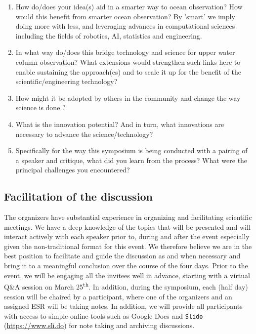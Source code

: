 \begin{enumerate}[noitemsep,topsep=0pt,parsep=0pt,partopsep=0pt]

\item How do/does your idea(s) aid in a smarter way to ocean
  observation? How would this benefit from smarter ocean observation? By
  'smart' we imply doing more with less, and leveraging advances in
  computational sciences including the fields of robotics, AI,
  statistics and engineering.

\item In what way do/does this bridge technology and science for upper
  water column observation? What extensions would strengthen such links
  here to enable sustaining the approach(es) and to scale it up for the
  benefit of the scientific/engineering technology?

\item How might it be adopted by others in the community and change the
  way science is done ?

\item What is the innovation potential? And in turn, what innovations
  are necessary to advance the science/technology?

\item Specifically for the way this symposium is being conducted with a
  pairing of a speaker and critique, what did you learn from the
  process? What were the principal challenges you encountered?

\end{enumerate}

\subsection{Facilitation of the discussion}

The organizers have substantial experience in organizing and
facilitating scientific meetings. We have a deep knowledge of the
topics that will be presented and will interact actively with each
speaker prior to, during and after the event especially given the
non-traditional format for this event. We therefore believe we are in
the best position to facilitate and guide the discussion as and when
necessary and bring it to a meaningful conclusion over the course of
the four days. Prior to the event, we will be engaging all the
invitees well in advance, starting with a virtual Q\&A session on
March 25\textsuperscript{th}. In addition, during the symposium, each
(half day) session will be chaired by a participant, where one of the
organizers and an assigned ESR will be taking notes. In addition, we
will provide all participants with access to simple online tools
such as Google Docs and \texttt{Slido} (\url{https://www.sli.do}) for
note taking and archiving discussions. 

